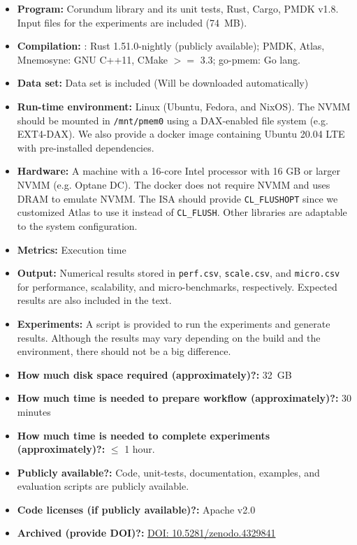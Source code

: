 {\small
\begin{itemize}
  \item {\bf Program: } Corundum library and its unit tests, Rust, Cargo, PMDK v1.8. Input files for the experiments are included (74~MB).
  \item {\bf Compilation: } \This{}: Rust 1.51.0-nightly (publicly available); PMDK, Atlas, Mnemosyne: GNU C++11, CMake $>=$ 3.3; go-pmem: Go lang.
  \item {\bf Data set: } Data set is included (Will be downloaded automatically)
  \item {\bf Run-time environment: } Linux (Ubuntu, Fedora, and NixOS). The NVMM should be mounted in \verb+/mnt/pmem0+ using a DAX-enabled file system (e.g. EXT4-DAX). We also provide a docker image containing Ubuntu 20.04 LTE with pre-installed dependencies.
  \item {\bf Hardware: } A machine with a 16-core Intel processor with 16 GB or larger NVMM (e.g. Optane DC). The docker does not require NVMM and uses DRAM to emulate NVMM. The ISA should provide \verb+CL_FLUSHOPT+ since we customized Atlas to use it instead of \verb+CL_FLUSH+. Other libraries are adaptable to the system configuration.
  \item {\bf Metrics: } Execution time
  \item {\bf Output: } Numerical results stored in \verb+perf.csv+, \verb+scale.csv+, and \verb+micro.csv+ for performance, scalability, and micro-benchmarks, respectively. Expected results are also included in the text.
  \item {\bf Experiments: } A script is provided to run the experiments and generate results. Although the results may vary depending on the build and the environment, there should not be a big difference.
  \item {\bf How much disk space required (approximately)?: } 32~GB
  \item {\bf How much time is needed to prepare workflow (approximately)?: } 30 minutes
  \item {\bf How much time is needed to complete experiments (approximately)?: } $\leq$ 1 hour.
  \item {\bf Publicly available?: } Code, unit-tests, documentation, examples, and evaluation scripts are publicly available.
  \item {\bf Code licenses (if publicly available)?: } Apache v2.0
  \item {\bf Archived (provide DOI)?: } \href{https://zenodo.org/record/4329841}{DOI: 10.5281/zenodo.4329841}
\end{itemize}

}
